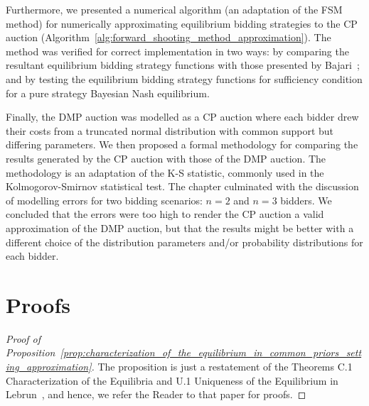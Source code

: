 Furthermore, we presented a numerical algorithm (an adaptation of the FSM method) for numerically approximating equilibrium bidding strategies to the CP auction (Algorithm~\ref{alg:forward_shooting_method_approximation}). The method was verified for correct implementation in two ways: by comparing the resultant equilibrium bidding strategy functions with those presented by Bajari~\cite{Bajari2001a}; and by testing the equilibrium bidding strategy functions for sufficiency condition for a pure strategy Bayesian Nash equilibrium.

Finally, the DMP auction was modelled as a CP auction where each bidder drew their costs from a truncated normal distribution with common support but differing parameters. We then proposed a formal methodology for comparing the results generated by the CP auction with those of the DMP auction. The methodology is an adaptation of the K-S statistic, commonly used in the Kolmogorov-Smirnov statistical test. The chapter culminated with the discussion of modelling errors for two bidding scenarios: $n=2$ and $n=3$ bidders. We concluded that the errors were too high to render the CP auction a valid approximation of the DMP auction, but that the results might be better with a different choice of the distribution parameters and/or probability distributions for each bidder.

\section{Proofs} %
\label{sec:proofs_approximation}
\begin{proof}[Proof of Proposition~\ref{prop:characterization_of_the_equilibrium_in_common_priors_setting_approximation}]
The proposition is just a restatement of the Theorems C.1 Characterization of the Equilibria and U.1 Uniqueness of the Equilibrium in Lebrun~\cite{Lebrun2006}, and hence, we refer the Reader to that paper for proofs.
\end{proof}

